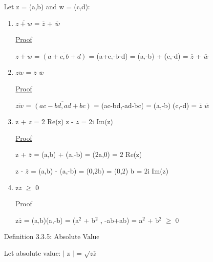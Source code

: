 	\qquad Let z = (a,b) and w = (c,d):
	\begin{enumerate}[label=(\alph*), leftmargin=2cm, itemsep=0.4em]
		\item $\overline{z+w}$ = $\overline{z}$ + $\overline{w}$

			{ \color{magenta} \underline{Proof} } 
			
				$\overline{z+w}$ = $\overline{(a+c,b+d)}$ = (a+c,-b-d)
				= (a,-b) + (c,-d) = $\overline{z}$ + $\overline{w}$

		\item $\overline{zw}$ = $\overline{z}$ $\overline{w}$

			{ \color{magenta} \underline{Proof} } 
			
				$\overline{zw}$ = $\overline{(ac-bd,ad+bc)}$ = (ac-bd,-ad-bc)
				= (a,-b) (c,-d) = $\overline{z}$ $\overline{w}$

		\item z + $\overline{z}$ = 2 Re(z) \qquad \qquad z - $\overline{z}$ = 2i Im(z)

			{ \color{magenta} \underline{Proof} } 
			
				z + $\overline{z}$ = (a,b) + (a,-b) = (2a,0) = 2 Re(z)

				z - $\overline{z}$ = (a,b) - (a,-b) = (0,2b) = (0,2) b = 2i Im(z)

		\item z$\overline{z}$ $\geq$ 0

			{ \color{magenta} \underline{Proof} } 
			
				z$\overline{z}$ = (a,b)(a,-b) = (a$^2$ + b$^2$ , -ab+ab) = a$^2$ + b$^2$ $\geq$ 0
	\end{enumerate}

{ \color{blue} Definition 3.3.5: Absolute Value } 
	
	\qquad Let absolute value: $|$ z $|$ = $\sqrt{z \overline{z}}$ \\

